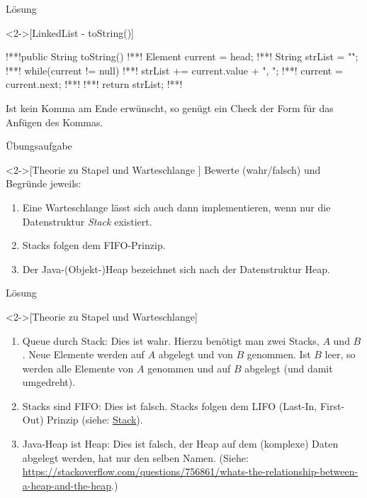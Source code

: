 \begin{frame}[fragile,c]{Lösung}
    \begin{solve}<2->[LinkedList - toString()]
        \pause{} %
\begin{plainjava}
!**!public String toString() {
!**!    Element current = head;
!**!    String strList = "";
!**!    while(current != null) {
!**!        strList += current.value + ", ";
!**!        current = current.next;
!**!    }
!**!    return strList;
!**!}
\end{plainjava}
        \pause{}Ist kein Komma am Ende erwünscht, so genügt ein Check der Form  für das Anfügen des Kommas.
    \end{solve}
\end{frame}

\begin{frame}[c]{Übungsaufgabe}
    \begin{exercise}<2->[Theorie zu Stapel und Warteschlange ]
        Bewerte (wahr/falsch) und Begründe jeweils: \begin{enumerate}[<+(1)->]
            \item Eine Warteschlange lässt sich auch dann implementieren, wenn nur die Datenstruktur \emph{Stack} existiert.
            \item Stacks folgen dem FIFO-Prinzip.
            \item Der Java-(Objekt-)Heap bezeichnet sich nach der Datenstruktur Heap.
        \end{enumerate}
    \end{exercise}
\end{frame}

\begin{frame}[c]{Lösung}
    \begin{solve}<2->[Theorie zu Stapel und Warteschlange]
        \begin{enumerate}[<+(1)->]
            \item Queue durch Stack:\pause{} Dies ist wahr. Hierzu benötigt man zwei Stacks, \(A\) und \(B\).\pause{} Neue Elemente werden auf \(A\) abgelegt und von \(B\) genommen.\pause{} Ist \(B\) leer, so werden alle Elemente von \(A\) genommen und auf \(B\) abgelegt (und damit umgedreht).
            \item Stacks sind FIFO:\pause{} Dies ist falsch.\pause{} Stacks folgen dem LIFO (Last-In, First-Out) Prinzip (siehe: \hyperlink{mrk:Stack}{Stack}).
            \item Java-Heap ist Heap:\pause{} Dies ist falsch, der Heap auf dem (komplexe) Daten abgelegt werden,\pause{} hat nur den selben Namen.\pause{} (Siehe: \url{https://stackoverflow.com/questions/756861/whats-the-relationship-between-a-heap-and-the-heap}.)
        \end{enumerate}
    \end{solve}
\end{frame}


